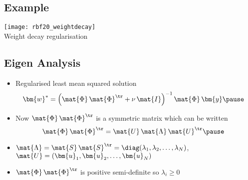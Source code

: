 
\begin{slide}
\section[-1]{Example}

\begin{center}
  \texttt{[image: rbf20\_weightdecay]}\\
  Weight decay regularisation\pause
\end{center}

\end{slide}


\begin{slide}
\section{Eigen Analysis}

\begin{PauseHighLight}

\begin{itemize}
\item Regularised least mean squared solution
  \begin{displaymath}
    \bm{w}^* = \left( \strut \mat{\Phi}\, \mat{\Phi}^\tr + \nu\, \mat{I}
    \right)^{-1} \mat{\Phi}\, \bm{y}\pause
  \end{displaymath}
\item Now $\mat{\Phi}\, \mat{\Phi}^\tr$ is a symmetric matrix which
  can be written
  \begin{displaymath}
    \mat{\Phi}\, \mat{\Phi}^\tr = \mat{U} \, \mat{\Lambda}\, \mat{U}^\tr\pause
  \end{displaymath}
\item $\mat{\Lambda}=\mat{S}\,\mat{S}^\tr = \diag(\lambda_1, \lambda_2,
  \ldots, \lambda_N)$, $\mat{U} = (\bm{u}_1, \bm{u}_2, \ldots, \bm{u}_N)$\pause
\item $\mat{\Phi}\, \mat{\Phi}^\tr$ is positive semi-definite so $\lambda_i
  \geq 0$\pause
\end{itemize}

\end{PauseHighLight}
\end{slide}



